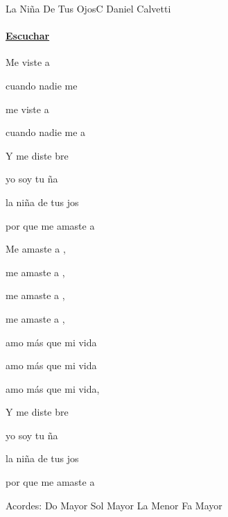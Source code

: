 \documentclass[12pt, spanish]{book}
\begin{document}
    \begin{song}{La Niña De Tus Ojos}{C}
    {} %
    {Daniel Calvetti}
    {} %
    {}
        \ifChordBk
        \paragraph{\mbox{}\hfill\protect\href{https://open.spotify.com/intl-es/track/4B6Dq9yCXAyZUzGH8ULq1N}{Escuchar}\mbox{}\hfill}
        \fi


        \begin{SBOpGroup}
            Me viste a 

            cuando nadie me 

            me viste a 

            cuando nadie me a
        \end{SBOpGroup}

        \begin{SBOpGroup}
            Y me diste bre

            yo soy tu ña

            la niña de tus jos

            por que me amaste a 

            Me amaste a ,

            me amaste a ,

            me amaste a ,

            me amaste a ,
        \end{SBOpGroup}

        \begin{SBChorus}
             amo más que mi vida

             amo más que mi vida

             amo más que mi vida,

        \end{SBChorus}

        \begin{SBOpGroup}
            Y me diste bre

            yo soy tu ña

            la niña de tus jos

            por que me amaste a 
        \end{SBOpGroup}

        \ifChordBk
        \begin{SBOpGroup}
            Acordes:\break
            \upchord{\C}\qquad Do Mayor \hfill
            \upchord{\G}\qquad Sol Mayor \hfill\null\break
            \upchord{\Am}\qquad La Menor \hfill
            \upchord{\F}\qquad Fa Mayor \hfill\null\break
        \end{SBOpGroup}
        \fi
    \end{song}
\end{document}
